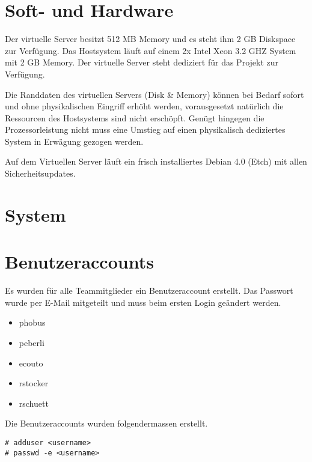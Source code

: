 \documentclass[12pt,halfparskip]{scrreprt}
\begin{document}

\section{Soft- und Hardware} %
\label{sec:soft_und_hardware}

Der virtuelle Server besitzt 512 MB Memory und es steht ihm 2 GB Diskspace zur Verfügung. Das Hostsystem läuft auf einem 2x Intel Xeon 3.2 GHZ System mit 2 GB Memory. Der virtuelle Server steht dediziert für das Projekt zur Verfügung.

Die Randdaten des virtuellen Servers (Disk \& Memory) können bei Bedarf sofort und ohne physikalischen Eingriff erhöht werden, vorausgesetzt natürlich die Ressourcen des Hostsystems sind nicht erschöpft. Genügt hingegen die Prozessorleistung nicht muss eine Umstieg auf einen physikalisch dediziertes System in Erwägung gezogen werden.

Auf dem Virtuellen Server läuft ein frisch installiertes Debian 4.0 (Etch) mit allen Sicherheitsupdates.


\section{System} %
\label{sec:system}


\section{Benutzeraccounts} %
\label{sec:benutzeraccounts}

Es wurden für alle Teammitglieder ein Benutzeraccount erstellt. Das Passwort wurde per E-Mail mitgeteilt und muss beim ersten Login geändert werden.

\begin{itemize}
  \item phobus
  \item peberli
  \item ecouto
  \item rstocker
  \item rschuett
\end{itemize}

Die Benutzeraccounts wurden folgendermassen erstellt. 

\begin{verbatim}
# adduser <username>
# passwd -e <username>
\end{verbatim}
\end{document}
